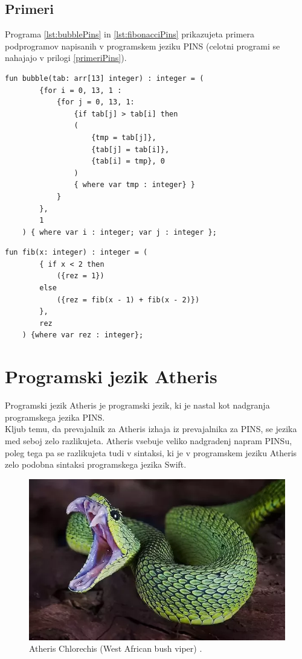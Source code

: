 \documentclass[a4paper, 12p]{book}
\begin{document}
\section{Primeri}

Programa \ref{lst:bubblePins} in \ref{lst:fibonacciPins} prikazujeta primera podprogramov napisanih v programskem jeziku PINS (celotni programi se nahajajo v prilogi \ref{primeriPins}).

\begin{lstlisting}[caption={Sortiranje z navadnimi zamenjavami.}, captionpos=b, label={lst:bubblePins}]
	fun bubble(tab: arr[13] integer) : integer = (
	    {for i = 0, 13, 1 :
	        {for j = 0, 13, 1:
	            {if tab[j] > tab[i] then 
	            (
	                {tmp = tab[j]},
	                {tab[j] = tab[i]},
	                {tab[i] = tmp}, 0
	            ) 
	            { where var tmp : integer} }
	    	}
		},
		1
	) { where var i : integer; var j : integer };
\end{lstlisting}

\begin{lstlisting}[caption={Izračun n-tega fibonaccijevega števila.}, captionpos=b, label={lst:fibonacciPins}]
	fun fib(x: integer) : integer = (
	    { if x < 2 then
	        ({rez = 1})
	    else 
	        ({rez = fib(x - 1) + fib(x - 2)})
	    },
	    rez
	) {where var rez : integer};
\end{lstlisting}

\chapter{Programski jezik Atheris}
\label{ch1}

Programski jezik Atheris je programski jezik, ki je nastal kot nadgranja programskega jezika PINS. \\
\indent Kljub temu, da prevajalnik za Atheris izhaja iz prevajalnika za PINS, se jezika med seboj zelo razlikujeta. Atheris vsebuje veliko nadgradenj napram PINSu, poleg tega pa se razlikujeta tudi v sintaksi, ki je v programskem jeziku Atheris zelo podobna sintaksi programskega jezika Swift. 
\begin{figure}[h]
	\begin{center}
		\includegraphics[width=1\textwidth]{resources/atheris.png}
	\end{center}
	\caption{Atheris Chlorechis (West African bush viper) \cite{Atheris}.}
	\label{image:ast}
\end{figure}
\end{document}
